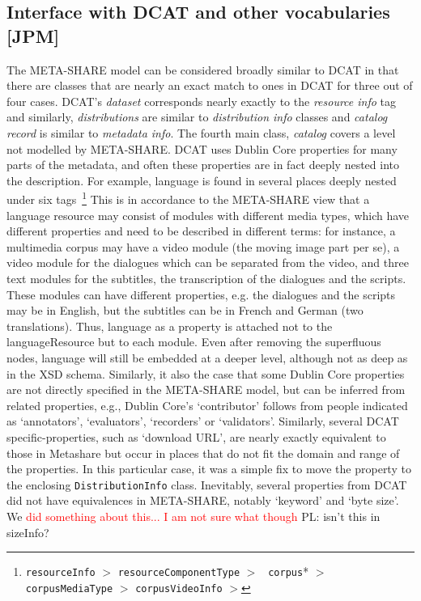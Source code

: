 \documentclass{llncs}
\begin{document}
{\subsection{Interface with DCAT and other vocabularies [JPM]}
\label{sec:dcat}
The META-SHARE model can be considered broadly similar to DCAT in that there are
classes that are nearly an exact match to ones in DCAT for three out of four
cases. DCAT's \emph{dataset} corresponds nearly exactly to the \emph{resource
info} tag and similarly, \emph{distributions} are similar to \emph{distribution
info} classes and \emph{catalog record} is similar to \emph{metadata info}. The
fourth main class, \emph{catalog} covers a level not modelled by META-SHARE.
DCAT uses Dublin Core properties for many parts of the metadata, and often these
properties are in fact deeply nested into the description. For example, language
is found in several places deeply nested under six
tags~\footnote{{\tt resourceInfo} $>$ {\tt resourceComponentType} $>$ {\tt
corpus}* $>$ {\tt corpusMediaType} $>$ {\tt corpusVideoInfo} $>$ {\tt}}
This is in accordance to the META-SHARE view that a language resource may consist of modules with different media types, which have different properties and need to be described in different terms: for instance, a multimedia corpus may have a video module (the moving image part per se), a video module for the dialogues which can be separated from the video, and three text modules for the subtitles, the transcription of the dialogues and the scripts. These modules can have different properties, e.g. the dialogues and the scripts may be in English, but the subtitles can be in French and German (two translations). Thus, language as a property is attached not to the languageResource but to each module. Even after removing the superfluous nodes, language will still be embedded at a deeper level, although not as deep as in the XSD schema.
Similarly, it also the case that some Dublin Core properties are not directly
specified in the META-SHARE model, but can be inferred from related properties,
e.g., Dublin Core's `contributor' follows from people indicated as `annotators',
`evaluators', `recorders' or `validators'. Similarly, several DCAT specific-properties, such as `download URL', are nearly
exactly equivalent to those in Metashare but occur in places that do not fit the
domain and range of the properties. In this particular case, it was a simple fix
to move the property to the enclosing {\tt DistributionInfo} class.
Inevitably, several properties from DCAT did not have equivalences in
META-SHARE, notably `keyword' and `byte size'. We \textcolor{red}{did something
about this... I am not sure what though}
{PL: isn't this in sizeInfo?}



}
\end{document}
